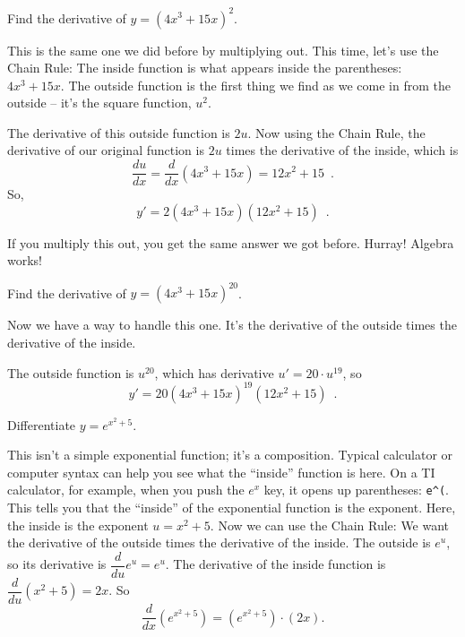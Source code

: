 \begin{example}
Find the derivative of $ y=\left(4x^3+15x\right)^2 $.

\begin{solution} This is the same one we did before by multiplying out. This time, let's use the Chain Rule: The inside function is what appears inside the parentheses: $4x^3+15x$. The outside function is the first thing we find as we come in from the outside -- it's the square function, $u^2$.

The derivative of this outside function is $2u$. Now using the Chain Rule, the derivative of our original function is $2u$ times the derivative of the inside, which is 
$$\dfrac{du}{dx} = \dfrac{d}{dx}(4x^3+15x) = 12x^2+15 \enspace .$$
So,
$$ y'=2\left(4x^3+15x\right)\left(12x^2+15 \right) \enspace .$$
\end{solution}\end{example}

If you multiply this out, you get the same answer we got before. Hurray! Algebra works!

\begin{example}
Find the derivative of $y=(4x^3+15x)^{20}$.

\begin{solution} Now we have a way to handle this one. It's the derivative of the outside times the derivative of the inside.

The outside function is $u^{20}$, which has derivative $u' = 20\cdot u^{19}$, so
$$y'=20\left(4x^3+15x\right)^{19}\left(12x^2+15\right) \enspace .$$
\end{solution}\end{example}

\begin{example}
Differentiate $y=e^{x^2+5}$.

\begin{solution} This isn't a simple exponential function; it's a composition. Typical calculator or computer syntax can help you see what the ``inside'' function is here. On a TI calculator, for example, when you push the $e^x$ key, it opens up parentheses: \verb|e^(|. This tells you that the ``inside'' of the exponential function is the exponent. Here, the inside is the exponent $u = x^2+5$. Now we can use the Chain Rule: We want the derivative of the outside times the derivative of the inside. The outside is $e^u$, so its derivative is $\dfrac{d}{du}e^u = e^u$. The derivative of the inside function is $\dfrac{d}{du}(x^2+5) = 2x$. So
$$\dfrac{d}{dx}\left( e^{x^2+5} \right)= \left( e^{x^2+5} \right)\cdot (2x).$$
\end{solution}\end{example}

